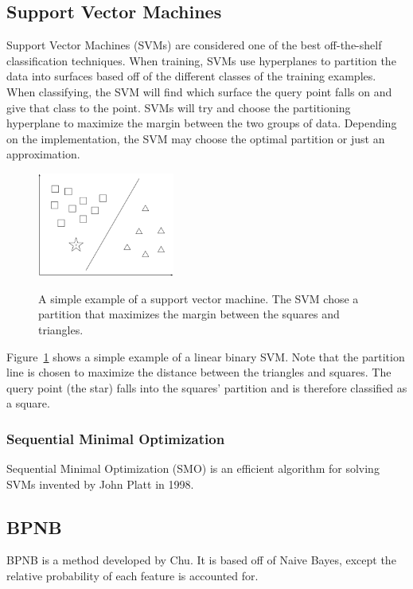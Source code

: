 \documentclass[12pt]{ucthesis}
\newcommand{\captionfonts}{\small\bf\ssp}
\begin{document}
\subsection{Support Vector Machines}
\label{background-classification-classifiers-svm}
Support Vector Machines (SVMs) are considered one of the best off-the-shelf classification techniques\cite{Vapnik}.
When training, SVMs use hyperplanes to partition the data into surfaces based off of the different classes of the training examples.
When classifying, the SVM will find which surface the query point falls on and give that class to the point.
SVMs will try and choose the partitioning hyperplane to maximize the margin between the two groups of data.
Depending on the implementation, the SVM may choose the optimal partition or just an approximation.

\begin{figure}
   \begin{center}
      \includegraphics[width=0.4\textwidth]{images/SVM.eps}
      \captionfonts
      \caption[Support Vector Machine]{A simple example of a support vector machine. The SVM chose a partition that maximizes the margin between the squares and triangles.}
      \label{fig:svm}
   \end{center}
\end{figure}

Figure~\ref{fig:svm} shows a simple example of a linear binary SVM.
Note that the partition line is chosen to maximize the distance between the triangles and squares.
The query point (the star) falls into the squares' partition and is therefore classified as a square.

\subsubsection{Sequential Minimal Optimization}
\label{background-classification-classifiers-svm-smo}
Sequential Minimal Optimization (SMO) is an efficient algorithm for solving SVMs invented by John Platt in 1998\cite{Platt}.

\subsection{BPNB}
\label{background-classification-classifiers-bpnb}
BPNB is a method developed by Chu\cite{bpnb}.
It is based off of Naive Bayes, except the relative probability of each feature is accounted for.
\end{document}
